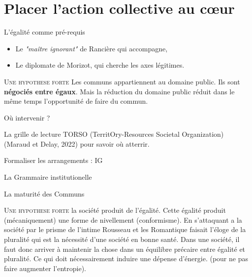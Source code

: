 \documentclass[newPxFont]{beamer}
\begin{document}
\section{Placer l'action collective au cœur}

\begin{frame}[c]{L'égalité comme pré-requis}
  \vspace{-1cm}

  \begin{itemize}
    \item Le \textit{"maître ignorant"} de Rancière qui accompagne, 
    \item Le diplomate de Morizot, qui cherche les axes légitimes.
  \end{itemize}
  
  \small{
    \begin{alertblock}{\textsc{Une hypothese forte}}
      Les communs appartiennent au domaine public. Ils sont \textbf{négociés entre égaux}. Mais la réduction du domaine public réduit dans le même temps l’opportunité de faire du commun.
    \end{alertblock}
  }
\end{frame}

\begin{frame}[c]{Où intervenir ?}
    \vspace{-1cm}

    
    
   La grille de lecture TORSO (TerritOry-Resources Societal Organization) (Maraud et Delay, 2022) pour savoir où atterrir.

\end{frame}

\begin{frame}[c]{Formaliser les arrangements : IG}
    \vspace{-1cm}

    La Grammaire institutionelle
\end{frame}

  \begin{frame}[c]{La maturité des Communs}
    \vspace{-1cm}
    
    \small{
      \begin{alertblock}{\textsc{Une hypothese forte}}
        la société produit de l’égalité. Cette égalité produit (mécaniquement) une forme de nivellement (conformisme). En s’attaquant a la société par le prisme de l’intime Rousseau et les Romantique faisait l’éloge de la pluralité qui est la nécessité d'une société en bonne santé. Dans une société, il faut donc arriver à maintenir la chose dans un équilibre précaire entre égalité et pluralité. Ce qui doit nécessairement induire une dépense d’énergie. (pour ne pas faire augmenter l'entropie). 
      \end{alertblock}
    }
  
    \end{frame}
\end{document}
